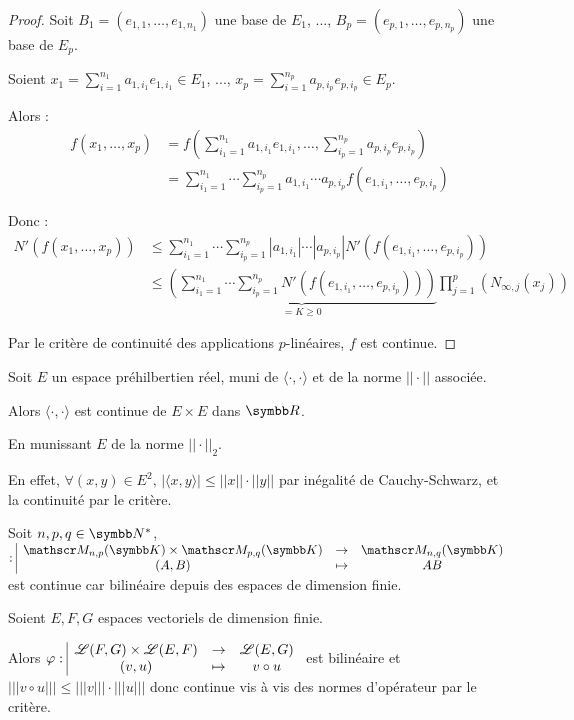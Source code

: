 \begin{proof}
    Soit $B_1 = (e_{1, 1}, \ldots, e_{1, n_1})$ une base de $E_1$, ..., $B_p = (e_{p, 1}, \ldots, e_{p, n_p})$ une base de $E_p$.

    Soient $\displaystyle x_1 = \sum_{i=1}^{n_1} a_{1, i_1} e_{1, i_1} \in E_1$, ..., $\displaystyle x_p = \sum_{i=1}^{n_p} a_{p, i_p} e_{p, i_p} \in E_p$.

    Alors :
    \begin{align*}
        f(x_1, \ldots, x_p) & = f\left( \sum_{i_1=1}^{n_1} a_{1, i_1} e_{1, i_1}, \ldots, \sum_{i_p=1}^{n_p} a_{p, i_p} e_{p, i_p} \right) \\
        & = \sum_{i_1=1}^{n_1} \cdots \sum_{i_p=1}^{n_p} a_{1, i_1} \cdots a_{p, i_p} f(e_{1, i_1}, \ldots, e_{p, i_p}) 
    \end{align*}

    Donc :
    \begin{align*}
        N'(f(x_1, \ldots, x_p)) & \leqslant \sum_{i_1=1}^{n_1} \cdots \sum_{i_p=1}^{n_p} |a_{1, i_1}| \cdots |a_{p, i_p}| N'(f(e_{1, i_1}, \ldots, e_{p, i_p})) \\
        & \leqslant \underbrace{\left( \sum_{i_1=1}^{n_1} \cdots \sum_{i_p=1}^{n_p} N'(f(e_{1, i_1}, \ldots, e_{p, i_p})) \right)}_{ = K \geqslant 0} \prod_{j=1}^p \left( N_{\infty, j}(x_j) \right)
    \end{align*}

    Par le critère de continuité des applications $p$-linéaires, $f$ est continue.
\end{proof}

\begin{exemple}
    Soit $E$ un espace préhilbertien réel, muni de $\langle \cdot, \cdot \rangle$ et de la norme $||\cdot||$ associée.

    Alors $\langle \cdot, \cdot\rangle$ est continue de $E \times E$ dans $\R$. 

    En munissant $E$ de la norme $||\cdot||_2$. 

    En effet, $\forall (x, y) \in E^2, \, |\langle x, y\rangle| \leqslant ||x|| \cdot ||y||$ par inégalité de Cauchy-Schwarz,
    et la continuité par le critère. 

    \lvspace Soit $n, p, q \in \N^*$, $\fonction{}{\mathscr M_{n, p}(\K) \times \mathscr M_{p, q}(\K)}{\mathscr M_{n, q}(\K)}{(A, B)}{AB}$ est
    continue car bilinéaire depuis des espaces de dimension finie. 


    \lvspace Soient $E, F, G$ espaces vectoriels de dimension finie.
    
    Alors $\varphi: \space \begin{array}{|ccc} \displaystyle \mathscr L(F, G) \times \mathscr L(E, F) & \to & \displaystyle \mathscr L(E, G) \\ \displaystyle (v, u) & \mapsto & \displaystyle v \circ u \end{array}$ est bilinéaire
    et $||| v \circ u||| \leqslant |||v||| \cdot |||u|||$ donc continue vis à vis des normes d'opérateur par 
    le critère. 
\end{exemple}

